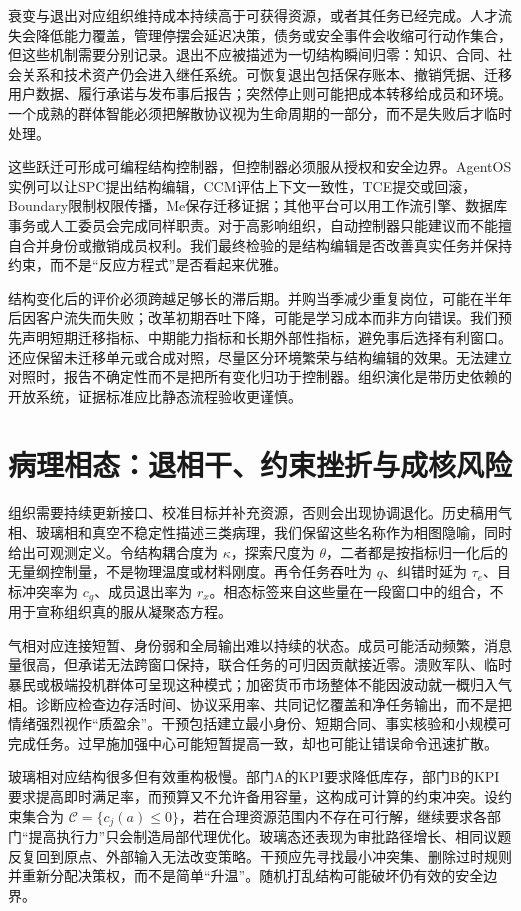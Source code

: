 衰变与退出对应组织维持成本持续高于可获得资源，或者其任务已经完成。人才流失会降低能力覆盖，管理停摆会延迟决策，债务或安全事件会收缩可行动作集合，但这些机制需要分别记录。退出不应被描述为一切结构瞬间归零：知识、合同、社会关系和技术资产仍会进入继任系统。可恢复退出包括保存账本、撤销凭据、迁移用户数据、履行承诺与发布事后报告；突然停止则可能把成本转移给成员和环境。一个成熟的群体智能必须把解散协议视为生命周期的一部分，而不是失败后才临时处理。

这些跃迁可形成可编程结构控制器，但控制器必须服从授权和安全边界。AgentOS实例可以让SPC提出结构编辑，CCM评估上下文一致性，TCE提交或回滚，Boundary限制权限传播，Me保存迁移证据；其他平台可以用工作流引擎、数据库事务或人工委员会完成同样职责。对于高影响组织，自动控制器只能建议而不能擅自合并身份或撤销成员权利。我们最终检验的是结构编辑是否改善真实任务并保持约束，而不是“反应方程式”是否看起来优雅。

结构变化后的评价必须跨越足够长的滞后期。并购当季减少重复岗位，可能在半年后因客户流失而失败；改革初期吞吐下降，可能是学习成本而非方向错误。我们预先声明短期迁移指标、中期能力指标和长期外部性指标，避免事后选择有利窗口。还应保留未迁移单元或合成对照，尽量区分环境繁荣与结构编辑的效果。无法建立对照时，报告不确定性而不是把所有变化归功于控制器。组织演化是带历史依赖的开放系统，证据标准应比静态流程验收更谨慎。

\section{病理相态：退相干、约束挫折与成核风险}
\label{sec:section_9809}

组织需要持续更新接口、校准目标并补充资源，否则会出现协调退化。历史稿用气相、玻璃相和真空不稳定性描述三类病理，我们保留这些名称作为相图隐喻，同时给出可观测定义。令结构耦合度为 $\kappa$，探索尺度为 $\theta$，二者都是按指标归一化后的无量纲控制量，不是物理温度或材料刚度。再令任务吞吐为 $q$、纠错时延为 $\tau_e$、目标冲突率为 $c_g$、成员退出率为 $r_x$。相态标签来自这些量在一段窗口中的组合，不用于宣称组织真的服从凝聚态方程。

气相对应连接短暂、身份弱和全局输出难以持续的状态。成员可能活动频繁，消息量很高，但承诺无法跨窗口保持，联合任务的可归因贡献接近零。溃败军队、临时暴民或极端投机群体可呈现这种模式；加密货币市场整体不能因波动就一概归入气相。诊断应检查边存活时间、协议采用率、共同记忆覆盖和净任务输出，而不是把情绪强烈视作“质盈余”。干预包括建立最小身份、短期合同、事实核验和小规模可完成任务。过早施加强中心可能短暂提高一致，却也可能让错误命令迅速扩散。

玻璃相对应结构很多但有效重构极慢。部门A的KPI要求降低库存，部门B的KPI要求提高即时满足率，而预算又不允许备用容量，这构成可计算的约束冲突。设约束集合为 $\mathcal C=\{c_j(a)\le0\}$，若在合理资源范围内不存在可行解，继续要求各部门“提高执行力”只会制造局部代理优化。玻璃态还表现为审批路径增长、相同议题反复回到原点、外部输入无法改变策略。干预应先寻找最小冲突集、删除过时规则并重新分配决策权，而不是简单“升温”。随机打乱结构可能破坏仍有效的安全边界。


